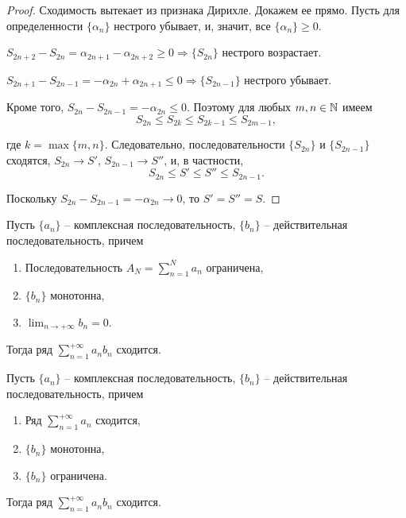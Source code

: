 \begin{proof}
    Сходимость вытекает из признака Дирихле. Докажем ее прямо. Пусть для определенности $\{\alpha_{n}\}$ нестрого убывает, и, значит, все $\{\alpha_{n}\} \geq 0$.
    
    $S_{2n + 2} - S_{2n} = \alpha_{2n + 1} - \alpha_{2n + 2} \geq 0 \Rightarrow \{S_{2n}\}$ нестрого возрастает.
    
    $S_{2n + 1} - S_{2n - 1} = -\alpha_{2n} + \alpha_{2n + 1} \leq 0 \Rightarrow \{S_{2n - 1}\}$ нестрого убывает.
    
    Кроме того, $S_{2n} - S_{2n - 1} = - \alpha_{2n} \leq 0$. Поэтому для любых $m, n \in \mathbb{N}$ имеем
    \[S_{2n} \leq S_{2k} \leq S_{2k - 1} \leq S_{2m - 1},\]
    
    где $k = \max\{m, n\}$. Следовательно, последовательности $\{S_{2n}\}$ и $\{S_{2n - 1}\}$ сходятся, $S_{2n} \to S'$, $S_{2n - 1} \to S''$, и, в частности,
    \[S_{2n} \leq S' \leq S'' \leq S_{2n - 1}.\]
    
    Поскольку $S_{2n} - S_{2n - 1} = -\alpha_{2n} \to 0$, то $S' = S'' = S$.
\end{proof}

\begin{theorem}
    Пусть $\{a_{n}\}$ -- комплексная последовательность, $\{b_{n}\}$ -- действительная последовательность, причем
    \begin{enumerate}
        \item Последовательность $A_{N} = \sum_{n = 1}^{N} a_{n}$ ограничена,
        \item $\{b_{n}\}$ монотонна,
        \item $\lim_{n \to +\infty} b_{n} = 0$.
    \end{enumerate}
    Тогда ряд $\sum_{n = 1}^{+\infty} a_{n}b_{n}$ сходится.
\end{theorem}

\begin{theorem}
    Пусть $\{a_{n}\}$ -- комплексная последовательность, $\{b_{n}\}$ -- действительная последовательность, причем
    \begin{enumerate}
        \item Ряд $\sum_{n = 1}^{+\infty} a_{n}$ сходится,
        \item $\{b_{n}\}$ монотонна,
        \item $\{b_{n}\}$ ограничена.
    \end{enumerate}
    Тогда ряд $\sum_{n = 1}^{+\infty} a_{n}b_{n}$ сходится.
\end{theorem}

